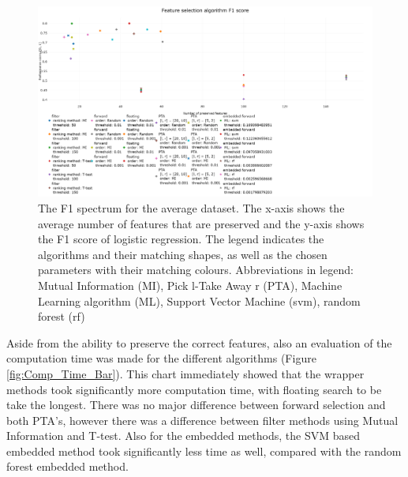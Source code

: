\documentclass[10pt,a4paper]{article}
\begin{document}
\begin{figure}[H]
	\centering
	\includegraphics[angle=90,height=1.4\textwidth]{F1_new.png}
	\caption{The F1 spectrum for the average dataset. The x-axis shows the average number of features that are preserved and the y-axis shows the F1 score of logistic regression. The legend indicates the algorithms and their matching shapes, as well as the chosen parameters with their matching colours. Abbreviations in legend: Mutual Information (MI), Pick l-Take Away r (PTA), Machine Learning algorithm (ML), Support Vector Machine (svm), random forest (rf)}
	\label{fig:Avg_F1_Spectrum}
\end{figure}

	Aside from the ability to preserve the correct features, also an evaluation of the computation time was made for the different algorithms (Figure \ref{fig:Comp_Time_Bar}). This chart immediately showed that the wrapper methods took significantly more computation time, with floating search to be take the longest. There was no major difference between forward selection and both PTA's, however there was a difference between filter methods using Mutual Information and T-test. Also for the embedded methods, the SVM based embedded method took significantly less time as well, compared with the random forest embedded method.
\end{document}
